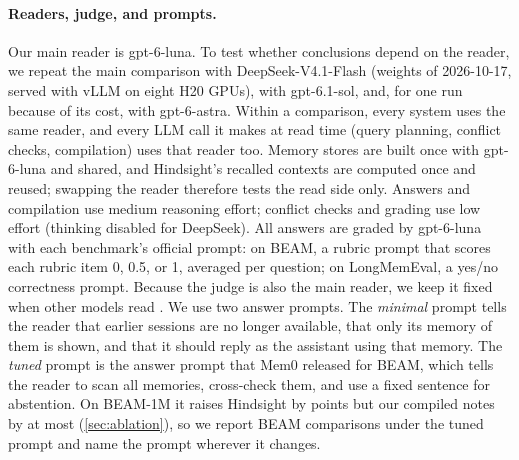 \paragraph{Readers, judge, and prompts.}
Our main reader is gpt-6-luna. To test whether conclusions depend on the reader, we repeat the main comparison with
DeepSeek-V4.1-Flash (weights of 2026-10-17, served with vLLM on eight H20 GPUs), with gpt-6.1-sol, and, for one run
because of its cost, with gpt-6-astra. Within a
comparison, every system uses the same reader, and every LLM call it makes at read time (query planning, conflict
checks, compilation) uses that reader too. Memory stores are built once with gpt-6-luna and shared, and Hindsight's
recalled contexts are computed once and reused; swapping the reader therefore tests the read side only. Answers and
compilation use medium reasoning effort; conflict checks and grading use low effort (thinking disabled for
DeepSeek). All answers are graded by gpt-6-luna with each benchmark's official prompt: on BEAM, a rubric prompt that
scores each rubric item 0, 0.5, or 1, averaged per question; on LongMemEval, a yes/no correctness prompt. Because the
judge is also the main reader, we keep it fixed when other models read . We use two answer prompts. The \emph{minimal} prompt tells the reader that
earlier sessions are no longer available, that only its memory of them is shown, and that it should reply as the
assistant using that memory. The \emph{tuned} prompt is the answer
prompt that Mem0 released for BEAM, which tells the reader to scan all memories, cross-check them, and use a fixed
sentence for abstention. On BEAM-1M it raises Hindsight by  points but our compiled notes by at most
 (\cref{sec:ablation}), so we report BEAM comparisons under the tuned prompt and name the prompt wherever it
changes.

